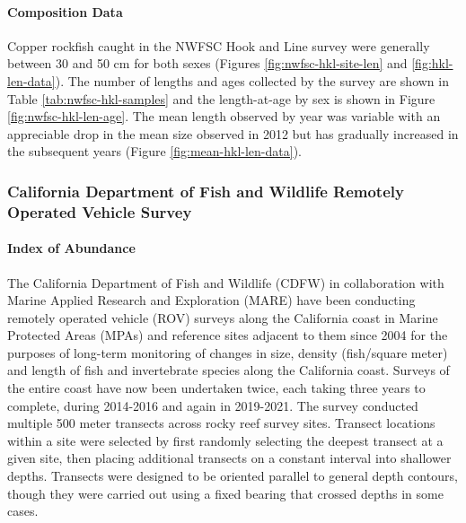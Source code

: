 \documentclass[11pt,
  english,
  letterpaper,
]{article}
\begin{document}
\hypertarget{composition-data-3}{%
\paragraph{Composition Data}\label{composition-data-3}}

\hfill\break

Copper rockfish caught in the NWFSC Hook and Line survey were generally between 30 and 50 cm for both sexes (Figures \ref{fig:nwfsc-hkl-site-len} and \ref{fig:hkl-len-data}). The number of lengths and ages collected by the survey are shown in Table \ref{tab:nwfsc-hkl-samples} and the length-at-age by sex is shown in Figure \ref{fig:nwfsc-hkl-len-age}. The mean length observed by year was variable with an appreciable drop in the mean size observed in 2012 but has gradually increased in the subsequent years (Figure \ref{fig:mean-hkl-len-data}).

\hypertarget{california-department-of-fish-and-wildlife-remotely-operated-vehicle-survey}{%
\subsubsection{California Department of Fish and Wildlife Remotely Operated Vehicle Survey}\label{california-department-of-fish-and-wildlife-remotely-operated-vehicle-survey}}

\hypertarget{index-of-abundance-2}{%
\paragraph{Index of Abundance}\label{index-of-abundance-2}}

\hfill\break

The California Department of Fish and Wildlife (CDFW) in collaboration with Marine Applied Research and Exploration (MARE) have been conducting remotely operated vehicle (ROV) surveys along the California coast in Marine Protected Areas (MPAs) and reference sites adjacent to them since 2004 for the purposes of long-term monitoring of changes in size, density (fish/square meter) and length of fish and invertebrate species along the California coast. Surveys of the entire coast have now been undertaken twice, each taking three years to complete, during 2014-2016 and again in 2019-2021. The survey conducted multiple 500 meter transects across rocky reef survey sites. Transect locations within a site were selected by first randomly selecting the deepest transect at a given site, then placing additional transects on a constant interval into shallower depths. Transects were designed to be oriented parallel to general depth contours, though they were carried out using a fixed bearing that crossed depths in some cases.
\end{document}
